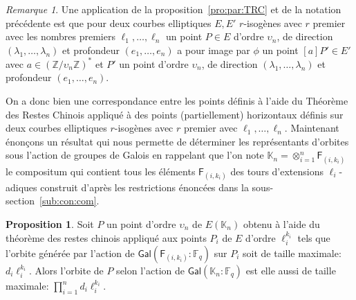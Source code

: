 \documentclass[10pt,a4paper]{book}
\theoremstyle{plain}
\theoremstyle{definition}
\theoremstyle{definition}
\theoremstyle{definition}
\newtheorem{prop}[thm]{Proposition}
\theoremstyle{definition}
\theoremstyle{remark}
\newtheorem{rem}[thm]{Remarque}
\theoremstyle{remark}
\theoremstyle{definition}
\begin{document}
\begin{rem}
Une application de la proposition~\ref{pro:par:TRC} et de la notation 
précédente est que pour deux courbes elliptiques $E,E'$ $r$-isogènes avec $r$ 
premier avec les nombres premiers $\ell_1, \dots, \ell_n$ un point $P \in E$ 
d'ordre $\upsilon_n$, de direction $(\lambda_1, \dots, \lambda_n)$ et 
profondeur $(e_1, \dots, e_n)$ a pour image par $\phi$ un point $[a]P' \in E'$
avec $a \in (\mathbb{Z}/\upsilon_n \mathbb{Z})^*$ et $P'$ un 
point d'ordre $\upsilon_n$, de direction $(\lambda_1, \dots, \lambda_n)$ et 
profondeur $(e_1, \dots, e_n)$.
\end{rem}
On a donc bien une correspondance entre les points définis à l'aide du Théorème
 des Restes Chinois appliqué à des points (partiellement) horizontaux définis 
 sur deux courbes elliptiques $r$-isogènes avec $r$ premier avec $\ell_1, \dots
 , \ell_n$.
 Maintenant énonçons un résultat qui nous permette de déterminer les 
 représentants d'orbites sous l'action de groupes de Galois en rappelant que 
 l'on note $\mathbb{K}_n=\otimes_{i=1}^{n}\mathsf{F}_{(i,k_i)}$ le compositum
 qui contient tous les éléments $\mathsf{F}_{(i,k_i)}$ des tours d'extensions
 $\ell_i$-adiques construit d'après les restrictions énoncées dans la 
 sous-section~\ref{sub:con:com}.
\begin{prop}
\label{pro:rep:com}
Soit $P$ un point d'ordre $\upsilon_n$ de $E(\mathbb{K}_n)$ obtenu à l'aide 
du théorème des restes chinois appliqué aux points $P_i$ de $E$ d'ordre 
$\ell_i^{k_i}$ tels que l'orbite générée par l'action de 
$\mathsf{Gal}(\mathsf{F}_{(i,k_i)}:\mathbb{F}_q)$ sur $P_i$ soit de taille
 maximale: $d_i\ell_i^{k_i}$.  Alors l'orbite de $P$ selon l'action de 
 $\mathsf{Gal}(\mathbb{K}_n:\mathbb{F}_q)$ est elle aussi de taille maximale:
 $\prod_{i=1}^nd_i\ell_i^{k_i}$.
\end{prop} 
\end{document}
